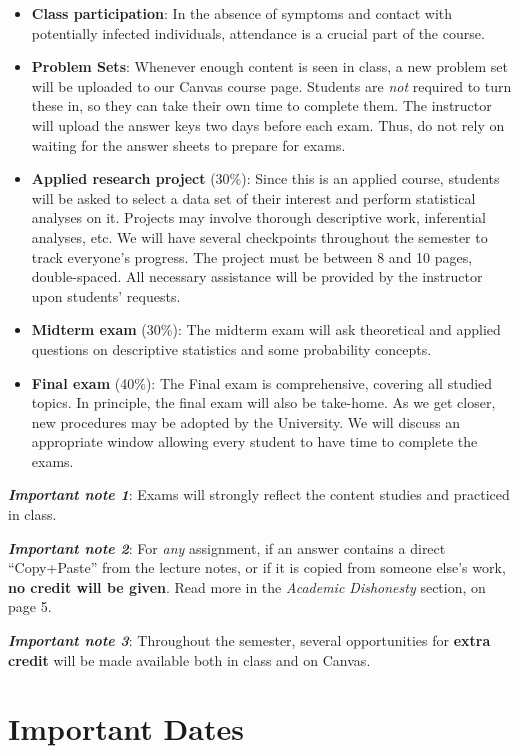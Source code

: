 \documentclass[11pt,]{article}
\begin{document}
\begin{itemize}
\item
  \textbf{Class participation}: In the absence of symptoms and contact
  with potentially infected individuals, attendance is a crucial part of
  the course.
\item
  \textbf{Problem Sets}: Whenever enough content is seen in class, a new
  problem set will be uploaded to our Canvas course page. Students are
  \emph{not} required to turn these in, so they can take their own time
  to complete them. The instructor will upload the answer keys two days
  before each exam. Thus, do not rely on waiting for the answer sheets
  to prepare for exams.
\item
  \textbf{Applied research project} (30\%): Since this is an applied
  course, students will be asked to select a data set of their interest
  and perform statistical analyses on it. Projects may involve thorough
  descriptive work, inferential analyses, etc. We will have several
  checkpoints throughout the semester to track everyone's progress. The
  project must be between 8 and 10 pages, double-spaced. All necessary
  assistance will be provided by the instructor upon students' requests.
\item
  \textbf{Midterm exam} (30\%): The midterm exam will ask theoretical
  and applied questions on descriptive statistics and some probability
  concepts.
\item
  \textbf{Final exam} (40\%): The Final exam is comprehensive, covering
  all studied topics. In principle, the final exam will also be
  take-home. As we get closer, new procedures may be adopted by the
  University. We will discuss an appropriate window allowing every
  student to have time to complete the exams.
\end{itemize}

\textbf{\emph{Important note 1}}: Exams will strongly reflect the
content studies and practiced in class.

\textbf{\emph{Important note 2}}: For \emph{any} assignment, if an
answer contains a direct ``Copy+Paste'' from the lecture notes, or if it
is copied from someone else's work, \textbf{no credit will be given}.
Read more in the \emph{Academic Dishonesty} section, on page 5.

\textbf{\emph{Important note 3}}: Throughout the semester, several
opportunities for \textbf{extra credit} will be made available both in
class and on Canvas.

\hypertarget{important-dates}{%
\section{Important Dates}\label{important-dates}}
\end{document}
